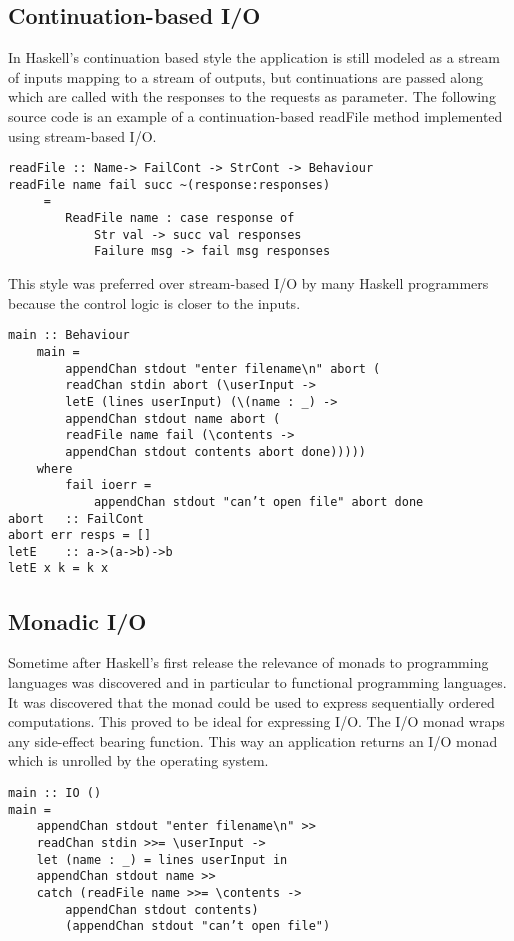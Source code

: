\subsection{Continuation-based I/O}
In Haskell's continuation based style the application is still modeled as a stream of inputs mapping to a stream of outputs, but continuations are passed along which are called with the responses to the requests as parameter. The following source code is an example of a continuation-based readFile method implemented using stream-based I/O.

\begin{lstlisting}[caption={Definition of readFile in continuation-based I/O in Haskell}]
readFile :: Name-> FailCont -> StrCont -> Behaviour
readFile name fail succ ~(response:responses)
	 =
		ReadFile name : case response of
			Str val -> succ val responses
			Failure msg -> fail msg responses
\end{lstlisting}

This style was preferred over stream-based I/O by many Haskell programmers because the control logic is closer to the inputs.

\begin{lstlisting}[caption={Example of continuation-based I/O in Haskell}]
main :: Behaviour
	main =
 		appendChan stdout "enter filename\n" abort (
		readChan stdin abort (\userInput ->
		letE (lines userInput) (\(name : _) ->
		appendChan stdout name abort (
		readFile name fail (\contents ->
		appendChan stdout contents abort done)))))
	where
		fail ioerr =
			appendChan stdout "can’t open file" abort done
abort	:: FailCont
abort err resps = []
letE	:: a->(a->b)->b
letE x k = k x
\end{lstlisting}

\subsection{Monadic I/O}
Sometime after Haskell's first release the relevance of monads to programming languages was discovered and in particular to functional programming languages. It was discovered that the monad could be used to express sequentially ordered computations. This proved to be ideal for expressing I/O. The I/O monad wraps any side-effect bearing function. This way an application returns an I/O monad which is unrolled by the operating system.

\begin{lstlisting}[caption={Example of monadic I/O in Haskell}]
main :: IO ()
main =
	appendChan stdout "enter filename\n" >>
	readChan stdin >>= \userInput ->
	let (name : _) = lines userInput in
	appendChan stdout name >>
	catch (readFile name >>= \contents ->
		appendChan stdout contents)
		(appendChan stdout "can’t open file")
\end{lstlisting}

